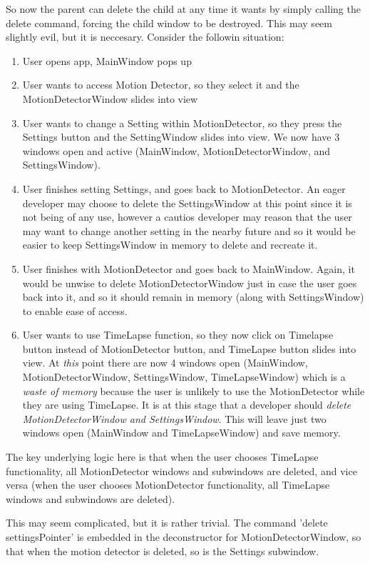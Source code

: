 \documentclass[11pt]{article} %
\begin{document}
So now the parent can delete the child at any time it wants by simply calling the delete command, forcing the child window to be destroyed. This may seem slightly evil, but it is neccesary. Consider the followin situation:
\begin{enumerate}
\item User opens app, MainWindow pops up
\item User wants to access Motion Detector, so they select it and the MotionDetectorWindow slides into view
\item User wants to change a Setting within MotionDetector, so they press the Settings button and the SettingWindow slides into view. We now have 3 windows open and active (MainWindow, MotionDetectorWindow, and SettingsWindow).
\item User finishes setting Settings, and goes back to MotionDetector. An eager developer may choose to delete the SettingsWindow at this point since it is not being of any use, however a cautios developer may reason that the user may want to change another setting in the nearby future and so it would be easier to keep SettingsWindow in memory to delete and recreate it.
\item User finishes with MotionDetector and goes back to MainWindow. Again, it would be unwise to delete MotionDetectorWindow just in case the user goes back into it, and so it should remain in memory (along with SettingsWindow) to enable ease of access.
\item User wants to use TimeLapse function, so they now click on Timelapse button instead of MotionDetector button, and TimeLapse button slides into view. At {\it this} point there are now 4 windows open (MainWindow, MotionDetectorWindow, SettingsWindow, TimeLapseWindow) which is a {\it waste of memory} because the user is unlikely to use the MotionDetector while they are using TimeLapse. It is at this stage that a developer should {\it delete MotionDetectorWindow and SettingsWindow}. This will leave just two windows open (MainWindow and TimeLapseWindow) and save memory.
\end{enumerate}
The key underlying logic here is that when the user chooses TimeLapse functionality, all MotionDetector windows and subwindows are deleted, and vice versa (when the user chooses MotionDetector functionality, all TimeLapse windows and subwindows are deleted).

This may seem complicated, but it is rather trivial. The command 'delete settingsPointer'  is embedded in the deconstructor for MotionDetectorWindow, so that when the motion detector is deleted, so is the Settings subwindow.
\end{document}
